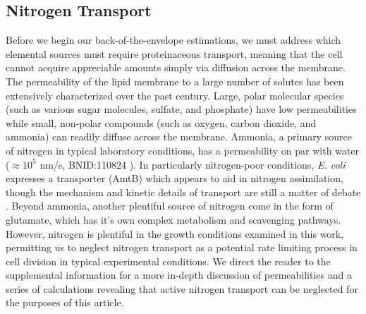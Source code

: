 \subsection{Nitrogen Transport}
Before we begin our back-of-the-envelope estimations, we must address which
elemental sources must require proteinaceous transport, meaning that the cell
cannot acquire appreciable amounts simply via diffusion across the membrane.
The permeability of the lipid membrane to a large number of solutes has been
extensively characterized over the past century. Large, polar
molecular species (such as various sugar molecules, sulfate, and phosphate) have
low permeabilities  while small, non-polar compounds (such as oxygen, carbon
dioxide, and ammonia) can readily diffuse across the
membrane. Ammonia, a primary source of nitrogen in typical laboratory
conditions, has a permeability on par with water ($\approx 10^5$ nm/s,
BNID:110824 \cite{milo2010}). In particularly nitrogen-poor
conditions, \textit{E. coli} expresses a transporter (AmtB) which appears to aid in
nitrogen assimilation, though the mechanism and kinetic details of transport
are still a matter of debate \citep{heeswijk2013a, khademi2004}. Beyond ammonia,
another plentiful source of nitrogen come in the form of glutamate, which has it's
own complex metabolism and scavenging pathways. However, nitrogen is plentiful
in the growth conditions examined in this work, permitting us to neglect
nitrogen transport as a potential rate limiting process in cell division in
typical experimental conditions. We direct the reader to the supplemental
information for a more in-depth discussion of permeabilities and a series of
calculations revealing that active nitrogen transport can be neglected for the
purposes of this article.

